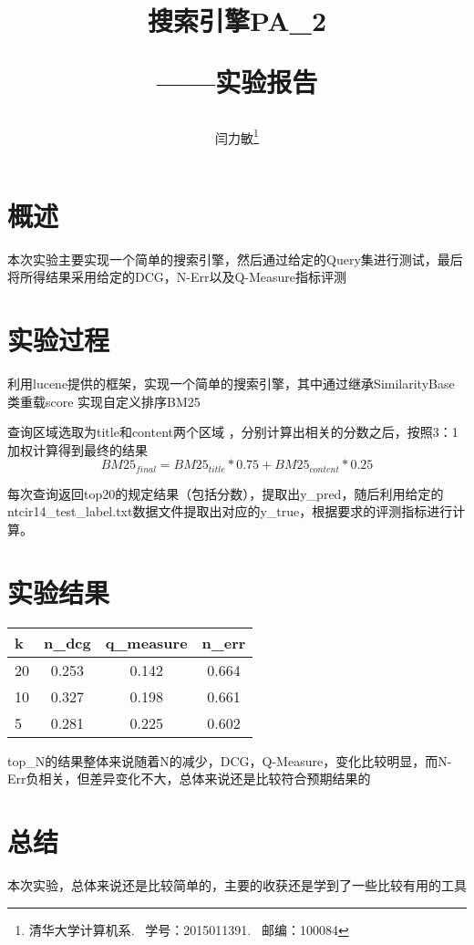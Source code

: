 \documentclass{article}
\begin{document}
\title{搜索引擎PA\_2 \\[1ex]\begin{Large}——实验报告\end{Large}}
\author{闫力敏\thanks{清华大学计算机系.~ 学号：2015011391.~ 邮编：100084}}
\date{}

	\maketitle

	\section{概述}
		本次实验主要实现一个简单的搜索引擎，然后通过给定的Query集进行测试，最后将所得结果采用给定的DCG，N-Err以及Q-Measure指标评测
	\section{实验过程}
		利用lucene提供的框架，实现一个简单的搜索引擎，其中通过继承SimilarityBase类重载score 实现自定义排序BM25
		\par
		查询区域选取为title和content两个区域	，分别计算出相关的分数之后，按照3：1加权计算得到最终的结果
		$$BM25_{final} = BM25_{title} * 0.75 + BM25_{content} * 0.25 $$
		\par
		每次查询返回top20的规定结果（包括分数），提取出y\_pred，随后利用给定的ntcir14\_test\_label.txt数据文件提取出对应的y\_true，根据要求的评测指标进行计算。
	\section{实验结果}
		\begin{tabular}{|l|c|c|c|} 
		\hline 
		k &n\_dcg&q\_measure&n\_err\\
		\hline 
		20 &0.253 &0.142& 0.664\\
		10 &0.327 &0.198& 0.661\\
		5 &0.281 &0.225& 0.602\\
		\hline 
		\end{tabular}
		\par 
		top\_N的结果整体来说随着N的减少，DCG，Q-Measure，变化比较明显，而N-Err负相关，但差异变化不大，总体来说还是比较符合预期结果的

	\section{总结}
		本次实验，总体来说还是比较简单的，主要的收获还是学到了一些比较有用的工具
	
	
\end{document}
